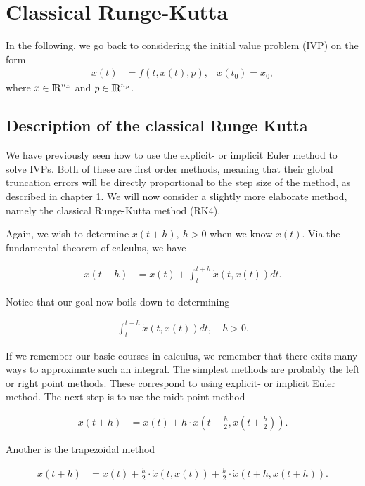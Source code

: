 \chapter{Classical Runge-Kutta}
In the following, we go back to considering the initial value problem (IVP) on the form
\begin{align}
    \dot{x}(t) &= f(t,x(t),p), & x(t_0) = x_0,
\end{align}
where $x \in \text{I\kern-0.15em R} ^{n_x}$ and $p \in \text{I\kern-0.15em R} ^{n_p}$. 

\section{Description of the classical Runge Kutta}
We have previously seen how to use the explicit- or implicit Euler method to solve IVPs. Both of these are first order methods, meaning that their global truncation errors will be directly proportional to the step size of the method, as described in chapter 1. We will now consider a slightly more elaborate method, namely the classical Runge-Kutta method (RK4). 

Again, we wish to determine $x(t+h), \ h>0$ when we know $x(t)$. Via the fundamental theorem of calculus, we have

\begin{align}
    x(t+h) &= x(t) + \int_{t}^{t+h} \dot{x}(t,x(t)) dt.
\end{align}

Notice that our goal now boils down to determining 

\begin{align}
\int_{t}^{t+h} \dot{x}(t,x(t)) dt, \quad h > 0.
\end{align}

If we remember our basic courses in calculus, we remember that there exits many ways to approximate such an integral. The simplest methods are probably the left or right point methods. These correspond to using explicit- or implicit Euler method. The next step is to use the midt point method 

\begin{align}
    x(t+h) &= x(t) + h \cdot \dot{x}\left (t+\frac{h}{2}, x\left (t+\frac{h}{2}\right) \right).
\end{align}

Another is the trapezoidal method

\begin{align}
    x(t+h) &= x(t) + \frac{h}{2} \cdot \dot{x}\left (t, x\left (t\right) \right) + \frac{h}{2} \cdot \dot{x}\left (t+h, x\left (t+h\right) \right).
\end{align}

